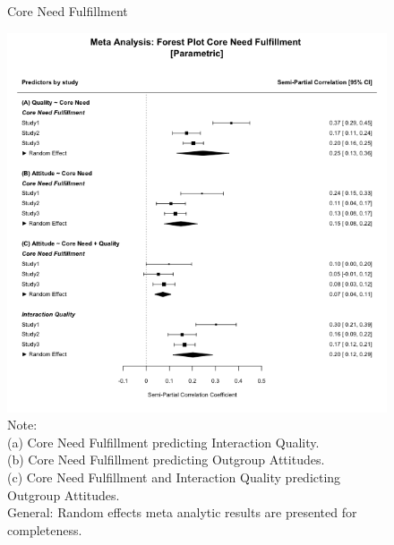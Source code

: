 \documentclass[man, 12pt, a4paper, mask]{apa7}
\theoremstyle{break}
\theoremstyle{plain}
\begin{document}
\begin{figure}
  \caption{Core Need Fulfillment}
  \label{fig:AllportNeedFulfillment}
  \centering\includegraphics[width=\textwidth]{Figures/forestParametricTheoryComb.png}
  \caption*{Note: \\
  (a) Core Need Fulfillment predicting Interaction Quality.\\
  (b) Core Need Fulfillment predicting Outgroup Attitudes.\\
  (c) Core Need Fulfillment and Interaction Quality predicting Outgroup Attitudes.\\
  General: Random effects meta analytic results are presented for completeness.}
\end{figure}
\end{document}
